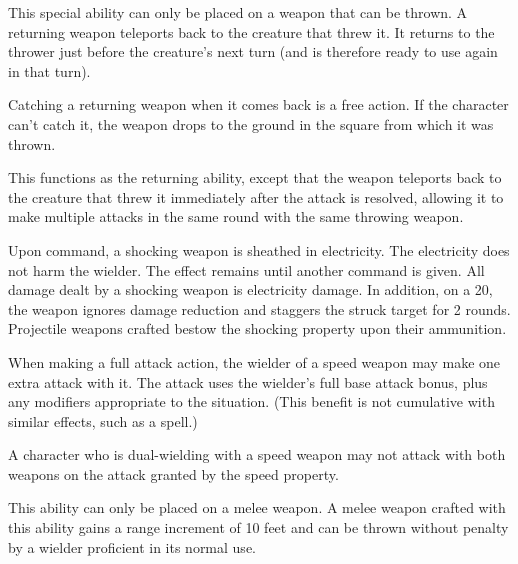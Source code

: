 
 This special ability can only be placed on a weapon that can be thrown. A returning weapon teleports back to the creature that threw it. It returns to the thrower just before the creature's next turn (and is therefore ready to use again in that turn).

Catching a returning weapon when it comes back is a free action. If the character can't catch it, the weapon drops to the ground in the square from which it was thrown.


 This functions as the returning ability, except that the weapon teleports back to the creature that threw it immediately after the attack is resolved, allowing it to make multiple attacks in the same round with the same throwing weapon.


 Upon command, a shocking weapon is sheathed in electricity. The electricity does not harm the wielder. The effect remains until another command is given. All damage dealt by a shocking weapon is electricity damage. In addition, on a 20, the weapon ignores damage reduction and staggers the struck target for 2 rounds. Projectile weapons crafted bestow the shocking property upon their ammunition.


 When making a full attack action, the wielder of a speed weapon may make one extra attack with it. The attack uses the wielder's full base attack bonus, plus any modifiers appropriate to the situation. (This benefit is not cumulative with similar effects, such as a  spell.)

A character who is dual-wielding with a speed weapon may not attack with both weapons on the attack granted by the speed property.


 This ability can only be placed on a melee weapon. A melee weapon crafted with this ability gains a range increment of 10 feet and can be thrown without penalty by a wielder proficient in its normal use.

